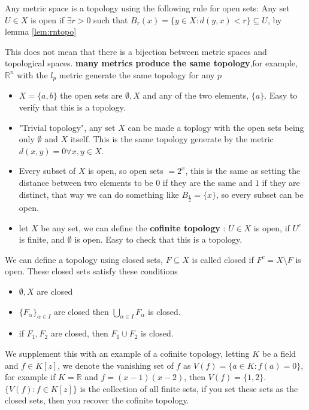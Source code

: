 \documentclass[12pt]{article}
\begin{document}
\begin{lemma}
    Any metric space is a topology using the following rule for open sets: Any set $U \in X$ is open if $\exists r > 0$ such that $B_r(x) = \{y \in X \colon d(y,x) < r\} \subseteq U$, by lemma \ref{lem:rntopo}
\end{lemma}
This does not mean that there is a bijection between metric spaces and topological spaces. \textbf{many metrics produce the same topology},for example, $\mathbb{R}^n$ with the $l_p$ metric generate the same topology for any $p$
\begin{examples}
    \begin{itemize}
        \item $X = \{a,b\}$ the open sets are $\emptyset, X$ and any of the two elements, $\{a\}$. Easy to verify that this is a topology.
        \item "Trivial topology", any set $X$ can be made a toplogy with the open sets being only $\emptyset$ and $X$ itself. This is the same topology generate by the metric $d(x,y) = 0 \forall x,y \in X$. 
        \item  Every subset of $X$ is open, so open sets $ = 2^x$, this is the same as setting the distance between two elements to be $0$ if they are the same and $1$ if they are distinct, that way we can do something like $B_{\frac{1}{2}} = \{x\}$, so every subset can be open. 
        \item let $X$ be any set, we can define the \textbf{cofinite topology} : $U \in X$ is open, if $U^c$ is finite, and $\emptyset$ is open. Easy to check that this is a topology.
    \end{itemize}
\end{examples}
\begin{definition}
    We can define a topology using closed sets, $F \subseteq X$ is called closed if $F^c = X\setminus F$ is open. These closed sets satisfy these conditions
    \begin{itemize}
        \item $\emptyset, X$ are closed
        \item $\{F_\alpha\}_{\alpha \in I}$ are closed then $ \bigcup_{\alpha \in I} F_\alpha$ is closed.
        \item if $F_1, F_2$ are closed, then $F_1 \cup F_2$ is closed. 
    \end{itemize}

\end{definition} 
\begin{examples}
    We supplement this with an example of a cofinite topology, letting $K$ be a field and $f \in K[z]$, we denote the vanishing set of $f$ as $V(f) = \{a \in K \colon f(a) = 0\}$, for example if $K = \mathbb{R}$ and $f = (x-1)(x-2)$, then $V(f) = \{1,2\}$. $\{ V(f) \colon f \in K[z]\}$ is the collection of all finite sets, if you set these sets as the closed sets, then you recover the cofinite topology.
\end{examples}
\end{document}
